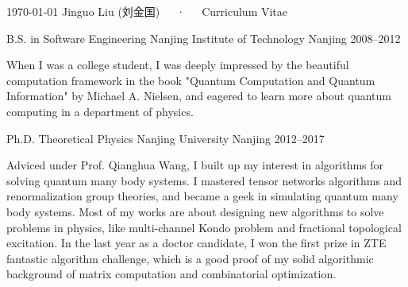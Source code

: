 \documentclass[11pt, a4paper]{awesome-cv}
\begin{document}
\makecvheader

\makecvfooter
  {\today}
  {Jinguo Liu (刘金国)~~~·~~~Curriculum Vitae}
  {\thepage}


\begin{cventries}
  \cventry
    {B.S. in Software Engineering}
    {Nanjing Institute of Technology}
    {Nanjing}
    {2008--2012}
    {\begin{cvitems}
     When I was a college student, I was deeply impressed by the beautiful computation framework in the book "Quantum Computation and Quantum Information" by Michael A. Nielsen, and eagered to learn more about quantum computing in a department of physics.
    \end{cvitems}}
  \cventry
    {Ph.D. Theoretical Physics}
    {Nanjing University}
    {Nanjing}
    {2012--2017}
    {\begin{cvitems}
    Adviced under Prof. Qianghua Wang, I built up my interest in algorithms for solving quantum many body systems.
    I mastered tensor networks algorithms and renormalization group theories, and became a geek in simulating quantum many body systems. Most of my works are about designing new algorithms to solve problems in physics, like multi-channel Kondo problem and fractional topological excitation.
    In the last year as a doctor candidate, I won the first prize in ZTE fantastic algorithm challenge, which is a good proof of my solid algorithmic background of matrix computation and combinatorial optimization.
    \end{cvitems}}
\end{cventries}
\end{document}

